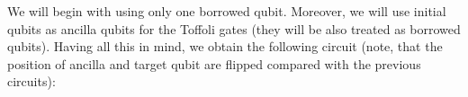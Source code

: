We will begin with using only one borrowed qubit. Moreover, we will use initial qubits as ancilla qubits for the Toffoli gates (they will be also treated as borrowed qubits). Having all this in mind, we obtain the following circuit (note, that the position of ancilla and target qubit are flipped compared with the previous circuits):

\begin{table}[ht]
\centering
{}
\label{my-label}
\end{table}

